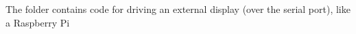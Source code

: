 The folder contains code for driving an external display (over the serial port), like a Raspberry Pi 
